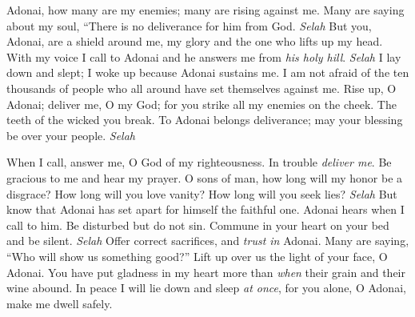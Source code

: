 \begin{biblechapter} %
 Adonai, how many are my enemies; 
many are rising against me.
\verse Many are saying about my soul, 
“There is no deliverance for him from God. \textit{Selah}
\verse But you, Adonai, are a shield around me, 
my glory and the one who lifts up my head.
\verse With my voice I call to Adonai 
and he answers me from \textit{his holy hill}. \textit{Selah}
\verse I lay down and slept; 
I woke up because Adonai sustains me.
\verse I am not afraid of the ten thousands of people 
who all around have set themselves against me.
\verse Rise up, O Adonai; deliver me, O my God; 
for you strike all my enemies on the cheek. 
The teeth of the wicked you break.
\verse To Adonai belongs deliverance; 
may your blessing be over your people. \textit{Selah}
\end{biblechapter}

\begin{biblechapter} %
 When I call, answer me, O God of my righteousness. 
In trouble \textit{deliver me}. 
Be gracious to me and hear my prayer.
\verse O sons of man, how long will my honor be a disgrace? 
How long will you love vanity? 
How long will you seek lies? \textit{Selah}
\verse But know that Adonai has set apart for himself the faithful one. 
Adonai hears when I call to him.
\verse Be disturbed but do not sin. 
Commune in your heart on your bed and be silent. \textit{Selah}
\verse Offer correct sacrifices, 
and \textit{trust in} Adonai.
\verse Many are saying, “Who will show us something good?” 
Lift up over us the light of your face, O Adonai.
\verse You have put gladness in my heart 
more than \textit{when} their grain and their wine abound.
\verse In peace I will lie down and sleep \textit{at once}, 
for you alone, O Adonai, make me dwell safely.
\end{biblechapter}

